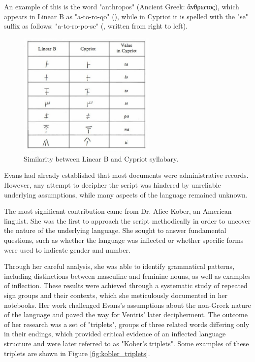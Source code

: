 An example of this is the word "anthropos" (Ancient Greek: \textgreek{ἄνθρωπος}), which appears in Linear B as "a-to-ro-qo" (\textlinb{\Ba\Bto\Bro\Bqo}), while in Cypriot it is spelled with the "se" suffix as follows: "a-to-ro-po-se" (\textcypr{\Cse\Cpo\Cro\Cto\Ca}, written from right to left).

\begin{figure}[H]
\centering
\includegraphics[width=0.6\textwidth]{Images/LB_cypriot.jpg}
\caption{Similarity between Linear B and Cypriot syllabary.}
\label{fig:lb-cypr}
\end{figure}

Evans had already established that most documents were administrative records.  
However, any attempt to decipher the script was hindered by unreliable underlying assumptions, while many aspects of the language remained unknown.

The most significant contribution came from Dr. Alice Kober, an American linguist. 
She was the first to approach the script methodically in order to uncover the nature of the underlying language.
She sought to answer fundamental questions, such as whether the language was inflected or whether specific forms were used to indicate gender and number.

Through her careful analysis, she was able to identify grammatical patterns, including distinctions between masculine and feminine nouns, as well as examples of inflection.
These results were achieved through a systematic study of repeated sign groups and their contexts, which she meticulously documented in her notebooks.
Her work challenged Evans's assumptions about the non-Greek nature of the language and paved the way for Ventris' later decipherment.
The outcome of her research was a set of "triplets", groups of three related words differing only in their endings, which provided critical evidence of an inflected language structure and were later referred to as "Kober's triplets".
Some examples of these triplets are shown in Figure \ref{fig:kobler_triplets}. \cite{chad-ch3}


